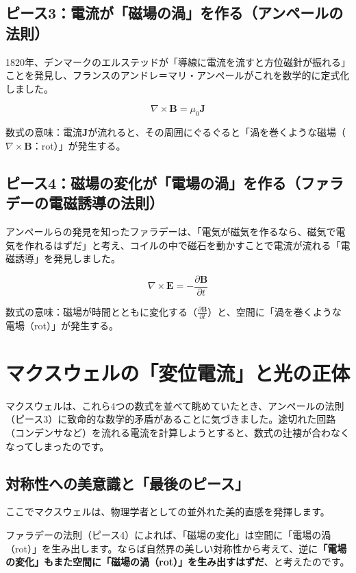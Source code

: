 \subsection{ピース3：電流が「磁場の渦」を作る（アンペールの法則）}

1820年、デンマークのエルステッドが「導線に電流を流すと方位磁針が振れる」ことを発見し、フランスのアンドレ＝マリ・アンペールがこれを数学的に定式化しました。

\[
\nabla\times\mathbf{B}=\mu_0\mathbf{J}
\]

数式の意味：電流\(\mathbf{J}\)が流れると、その周囲にぐるぐると「渦を巻くような磁場（\(\nabla\times\mathbf{B}\)：rot）」が発生する。

\subsection{ピース4：磁場の変化が「電場の渦」を作る（ファラデーの電磁誘導の法則）}

アンペールらの発見を知ったファラデーは、「電気が磁気を作るなら、磁気で電気を作れるはずだ」と考え、コイルの中で磁石を動かすことで電流が流れる「電磁誘導」を発見しました。

\[
\nabla\times\mathbf{E}=-\frac{\partial\mathbf{B}}{\partial t}
\]

数式の意味：磁場が時間とともに変化する（\(\frac{\partial \mathbf{B}}{\partial t}\)）と、空間に「渦を巻くような電場（rot）」が発生する。

\section{マクスウェルの「変位電流」と光の正体}

マクスウェルは、これら4つの数式を並べて眺めていたとき、アンペールの法則（ピース3）に致命的な数学的矛盾があることに気づきました。途切れた回路（コンデンサなど）を流れる電流を計算しようとすると、数式の辻褄が合わなくなってしまったのです。

\subsection{対称性への美意識と「最後のピース」}

ここでマクスウェルは、物理学者としての並外れた美的直感を発揮します。

ファラデーの法則（ピース4）によれば、「磁場の変化」は空間に「電場の渦（rot）」を生み出します。ならば自然界の美しい対称性から考えて、逆に\textbf{「電場の変化」もまた空間に「磁場の渦（rot）」を生み出すはずだ}、と考えたのです。

